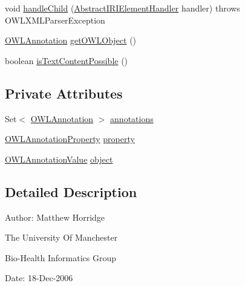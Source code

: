 \begin{DoxyCompactItemize}
\item 
void \hyperlink{classorg_1_1coode_1_1owlapi_1_1owlxmlparser_1_1_o_w_l_annotation_element_handler_acfc3bf233352defa03206267ccaa3cec}{handle\-Child} (\hyperlink{classorg_1_1coode_1_1owlapi_1_1owlxmlparser_1_1_abstract_i_r_i_element_handler}{Abstract\-I\-R\-I\-Element\-Handler} handler)  throws O\-W\-L\-X\-M\-L\-Parser\-Exception 
\item 
\hyperlink{interfaceorg_1_1semanticweb_1_1owlapi_1_1model_1_1_o_w_l_annotation}{O\-W\-L\-Annotation} \hyperlink{classorg_1_1coode_1_1owlapi_1_1owlxmlparser_1_1_o_w_l_annotation_element_handler_a125955b6c346440e1f6fd692d72e2124}{get\-O\-W\-L\-Object} ()
\item 
boolean \hyperlink{classorg_1_1coode_1_1owlapi_1_1owlxmlparser_1_1_o_w_l_annotation_element_handler_a8b6094018854f0d56233aaf75204d1d8}{is\-Text\-Content\-Possible} ()
\end{DoxyCompactItemize}
\subsection*{Private Attributes}
\begin{DoxyCompactItemize}
\item 
Set$<$ \hyperlink{interfaceorg_1_1semanticweb_1_1owlapi_1_1model_1_1_o_w_l_annotation}{O\-W\-L\-Annotation} $>$ \hyperlink{classorg_1_1coode_1_1owlapi_1_1owlxmlparser_1_1_o_w_l_annotation_element_handler_af24c54c44670885ae8d205ac3e7b9f13}{annotations}
\item 
\hyperlink{interfaceorg_1_1semanticweb_1_1owlapi_1_1model_1_1_o_w_l_annotation_property}{O\-W\-L\-Annotation\-Property} \hyperlink{classorg_1_1coode_1_1owlapi_1_1owlxmlparser_1_1_o_w_l_annotation_element_handler_ac74fa82fed2bdabcbc881859c3bc5605}{property}
\item 
\hyperlink{interfaceorg_1_1semanticweb_1_1owlapi_1_1model_1_1_o_w_l_annotation_value}{O\-W\-L\-Annotation\-Value} \hyperlink{classorg_1_1coode_1_1owlapi_1_1owlxmlparser_1_1_o_w_l_annotation_element_handler_a04ea2cb961b9ba958229655fa8233991}{object}
\end{DoxyCompactItemize}


\subsection{Detailed Description}
Author\-: Matthew Horridge\par
 The University Of Manchester\par
 Bio-\/\-Health Informatics Group\par
 Date\-: 18-\/\-Dec-\/2006\par
\par
 

